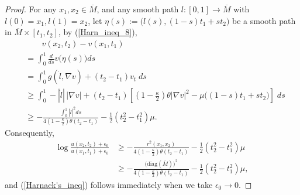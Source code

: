 \documentclass[12pt]{amsart}
\theoremstyle{definition}
\theoremstyle{remark}
\numberwithin{equation}{section}
\begin{document}
\begin{proof}
	For any $x_1, x_2 \in \overline{M}$, and any smooth path $l : [0, 1] \rightarrow \overline{M}$ with $l(0) = x_1, l(1) = x_2$, let $\eta(s) := \big(l(s), (1-s) t_1 + s t_2\big)$ be a smooth path in $\overline{M} \times [t_1, t_2]$, by (\ref{Harn_ineq_8}),
	\begin{equation}
	\begin{aligned}
	& \qquad v(x_2, t_2) - v(x_1, t_1)\\
	&= \int_{0}^{1} \frac{d}{ds} v\big(\eta(s)\big) ds \\
	&= \int_{0}^{1} g(\dot{l}, \nabla v) + (t_2 - t_1) v_t \; ds\\
	&\geq \int_{0}^{1} -|\dot{l}|\,|\nabla v| + (t_2 - t_1) \left[(1 - \frac{\kappa}{2})\theta |\nabla v|^2 - \mu \big( (1-s) t_1 + s t_2 \big) \right] \; ds \\
	&\geq - \frac{\int_{0}^{1} |\dot{l}|^2 ds}{4(1 - \frac{\kappa}{2})\theta (t_2 - t_1)} - \frac{1}{2}(t_2^2 - t_1^2)\mu.
	\end{aligned}
	\end{equation}
	Consequently,
	\begin{equation}
	\begin{aligned}
	\log \frac{u(x_2, t_2) + \epsilon_0}{u(x_1, t_1) + \epsilon_0} &\geq - \frac{r^2(x_1, x_2)}{4(1 - \frac{\kappa}{2})\theta (t_2 - t_1)} - \frac{1}{2}(t_2^2 - t_1^2)\mu\\
	&\geq - \frac{\big(\text{diag}(\overline{M})\big)^2}{4(1 - \frac{\kappa}{2})\theta (t_2 - t_1)} - \frac{1}{2}(t_2^2 - t_1^2)\mu,
	\end{aligned}
	\end{equation}
	and (\ref{Harnack's_ineq}) follows immediately when we take $\epsilon_0 \rightarrow 0$.
\end{proof}


\bigskip
\end{document}

